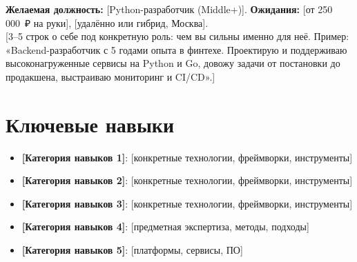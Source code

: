 \documentclass[11pt,a4paper,sans]{moderncv}
\begin{document}
\makecvtitle


\vspace{6pt}
\small{\textbf{Желаемая должность:} [Python-разработчик (Middle+)]. \textbf{Ожидания:} [от 250\,000~₽ на руки], [удалённо или гибрид, Москва].\\[3pt]
[3--5 строк о себе под конкретную роль: чем вы сильны именно для неё. Пример: «Backend-разработчик с 5 годами опыта в финтехе. Проектирую и поддерживаю высоконагруженные сервисы на Python и Go, довожу задачи от постановки до продакшена, выстраиваю мониторинг и CI/CD».]}


\section{Ключевые навыки}
\vspace{1pt}
\begin{itemize}

\item \textbf{[Категория навыков 1]}: [конкретные технологии, фреймворки, инструменты]

\item \textbf{[Категория навыков 2]}: [конкретные технологии, фреймворки, инструменты]

\item \textbf{[Категория навыков 3]}: [конкретные технологии, фреймворки, инструменты]

\item \textbf{[Категория навыков 4]}: [предметная экспертиза, методы, подходы]

\item \textbf{[Категория навыков 5]}: [платформы, сервисы, ПО]

\end{itemize}


\end{document}
